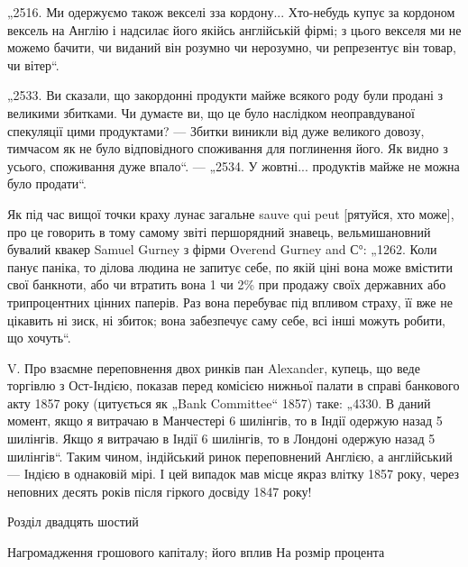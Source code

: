 „2516. Ми одержуємо також векселі зза кордону... Хто-небудь купує за кордоном вексель на Англію і
надсилає його якійсь англійській фірмі; з цього векселя ми не можемо бачити, чи виданий він розумно
чи нерозумно, чи репрезентує він товар, чи вітер“.

„2533. Ви сказали, що закордонні продукти майже всякого роду були продані з великими збитками. Чи
думаєте ви, що це було наслідком неоправдуваної
спекуляції цими продуктами? — Збитки виникли від дуже великого довозу, тимчасом як не було
відповідного споживання для поглинення його. Як видно з
усього, споживання дуже впало“. — „2534. У жовтні... продуктів майже не можна
було продати“.

Як під час вищої точки краху лунає загальне sauve qui peut [рятуйся, хто
може], про це говорить в тому самому звіті першорядний знавець, вельмишановний бувалий квакер Samuel
Gurney з фірми Overend Gurney and С°: „1262. Коли
панує паніка, то ділова людина не запитує себе, по якій ціні вона може вмістити свої банкноти, або
чи втратить вона 1 чи 2\% при продажу своїх державних або трипроцентних цінних паперів. Раз вона
перебуває під впливом страху, її вже не цікавить ні зиск, ні збиток; вона забезпечує саму себе, всі
інші
можуть робити, що хочуть“.

V. Про взаємне переповнення двох ринків пан Alexander, купець, що веде
торгівлю з Ост-Індією, показав перед комісією нижньої палати в справі банкового акту 1857 року
(цитується як „Bank Committee“ 1857) таке: „4330. В даний
момент, якщо я витрачаю в Манчестері 6 шилінгів, то в Індії одержую назад
5 шилінгів. Якщо я витрачаю в Індії 6 шилінгів, то в Лондоні одержую назад
5 шилінгів“. Таким чином, індійський ринок переповнений Англією, а англійський — Індією в однаковій
мірі. І цей випадок мав місце якраз влітку 1857 року,
через неповних десять років після гіркого досвіду 1847 року!

Розділ двадцять шостий

Нагромадження грошового капіталу; його вплив
На розмір процента


